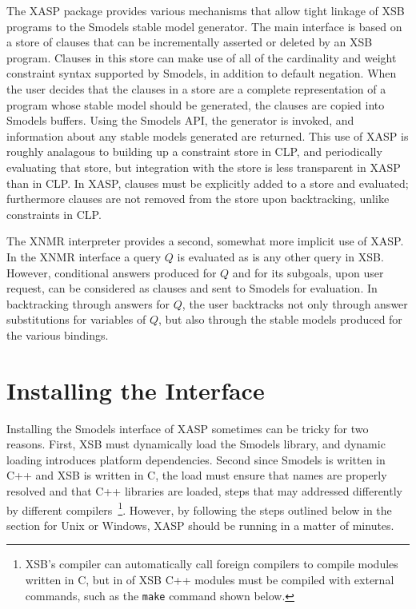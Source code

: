 The XASP package provides various mechanisms that allow tight linkage
of XSB programs to the Smodels \cite{smodels:engine} stable model
generator.  The main interface is based on a store of clauses that can
be incrementally asserted or deleted by an XSB program.  Clauses in
this store can make use of all of the cardinality and weight
constraint syntax supported by Smodels, in addition to default
negation.  When the user decides that the clauses in a store are a
complete representation of a program whose stable model should be
generated, the clauses are copied into Smodels buffers.  Using the
Smodels API, the generator is invoked, and information about any
stable models generated are returned.  This use of XASP is roughly
analagous to building up a constraint store in CLP, and periodically
evaluating that store, but integration with the store is less
transparent in XASP than in CLP.  In XASP, clauses must be explicitly
added to a store and evaluated; furthermore clauses are not removed
from the store upon backtracking, unlike constraints in CLP.

The XNMR interpreter provides a second, somewhat more implicit use of
XASP.  In the XNMR interface a query $Q$ is evaluated as is any other
query in XSB.  However, conditional answers produced for $Q$ and for
its subgoals, upon user request, can be considered as clauses and sent
to Smodels for evaluation.  In backtracking through answers for $Q$,
the user backtracks not only through answer substitutions for
variables of $Q$, but also through the stable models produced for the
various bindings. 

\section{Installing the Interface}

Installing the Smodels interface of XASP sometimes can be tricky for
two reasons.  First, XSB must dynamically load the Smodels library,
and dynamic loading introduces platform dependencies.  Second since
Smodels is written in C++ and XSB is written in C, the load must
ensure that names are properly resolved and that C++ libraries are
loaded, steps that may addressed differently by different
compilers~\footnote{XSB's compiler can automatically call foreign
  compilers to compile modules written in C, but in \version{} of XSB
  C++ modules must be compiled with external commands, such as the
  {\tt make} command shown below.}.  However, by following the steps
outlined below in the section for Unix or Windows, XASP should be
running in a matter of minutes.

